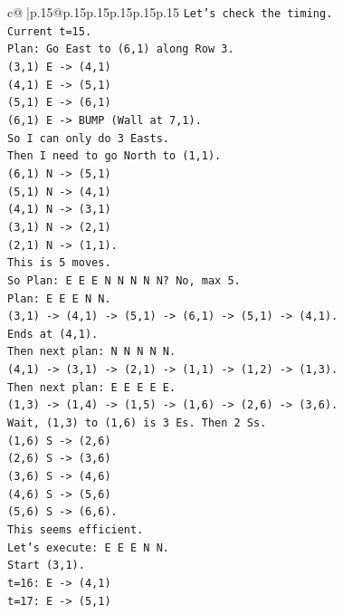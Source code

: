 \documentclass{article}
\begin{document}
{\begin{supertabular}{c@{$\;$}|p{.15\linewidth}@{}p{.15\linewidth}p{.15\linewidth}p{.15\linewidth}p{.15\linewidth}p{.15\linewidth}}
{{{\texttt{Let's check the timing.} \\
\texttt{Current t=15.} \\
\texttt{Plan: Go East to (6,1) along Row 3.} \\
\texttt{(3,1) E {-}> (4,1)} \\
\texttt{(4,1) E {-}> (5,1)} \\
\texttt{(5,1) E {-}> (6,1)} \\
\texttt{(6,1) E {-}> BUMP (Wall at 7,1).} \\
\texttt{So I can only do 3 Easts.} \\
\texttt{Then I need to go North to (1,1).} \\
\texttt{(6,1) N {-}> (5,1)} \\
\texttt{(5,1) N {-}> (4,1)} \\
\texttt{(4,1) N {-}> (3,1)} \\
\texttt{(3,1) N {-}> (2,1)} \\
\texttt{(2,1) N {-}> (1,1).} \\
\texttt{This is 5 moves.} \\
\texttt{So Plan: E E E N N N N N? No, max 5.} \\
\texttt{Plan: E E E N N.} \\
\texttt{(3,1) {-}> (4,1) {-}> (5,1) {-}> (6,1) {-}> (5,1) {-}> (4,1).} \\
\texttt{Ends at (4,1).} \\
\texttt{Then next plan: N N N N N.} \\
\texttt{(4,1) {-}> (3,1) {-}> (2,1) {-}> (1,1) {-}> (1,2) {-}> (1,3).} \\
\texttt{Then next plan: E E E E E.} \\
\texttt{(1,3) {-}> (1,4) {-}> (1,5) {-}> (1,6) {-}> (2,6) {-}> (3,6).} \\
\texttt{Wait, (1,3) to (1,6) is 3 Es. Then 2 Ss.} \\
\texttt{(1,6) S {-}> (2,6)} \\
\texttt{(2,6) S {-}> (3,6)} \\
\texttt{(3,6) S {-}> (4,6)} \\
\texttt{(4,6) S {-}> (5,6)} \\
\texttt{(5,6) S {-}> (6,6).} \\
\texttt{This seems efficient.} \\
\texttt{Let's execute: E E E N N.} \\
\texttt{Start (3,1).} \\
\texttt{t=16: E {-}> (4,1)} \\
\texttt{t=17: E {-}> (5,1)} \\
}}}
\end{supertabular}}
\end{document}
